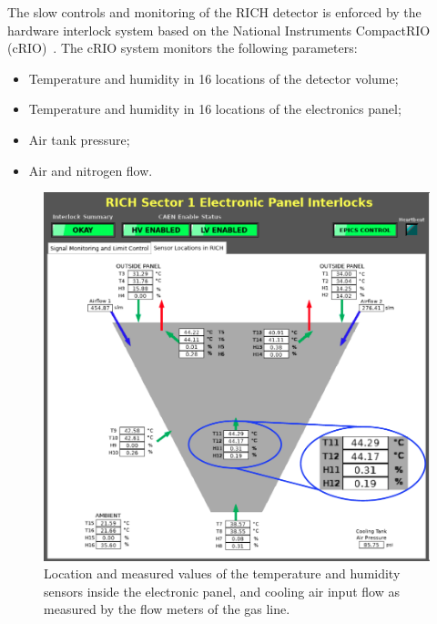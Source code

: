 \documentclass[5p,times,twocolumn]{elsarticle}
\begin{document}
The slow controls and monitoring of the RICH detector is enforced by the hardware interlock system based on the
National Instruments CompactRIO (cRIO)~\cite{Ref:cRIO}.
The cRIO system monitors the following parameters:
\begin{itemize}
\item Temperature and humidity in 16 locations of the detector volume;
\item Temperature and humidity in 16 locations of the electronics panel;
\item Air tank pressure;
\item Air and nitrogen flow. 
\end{itemize}

\begin{figure}[t]
\begin{center}
\includegraphics[width=0.9\columnwidth]{RICH_sensors_e_panel2.png}
\end{center}
\caption{Location and measured values of the temperature and humidity sensors inside the electronic panel, and cooling air input flow as measured by the flow meters of the gas line.}
\label{Fig:RICH_sensors_e_panel}
\end{figure}
\end{document}
